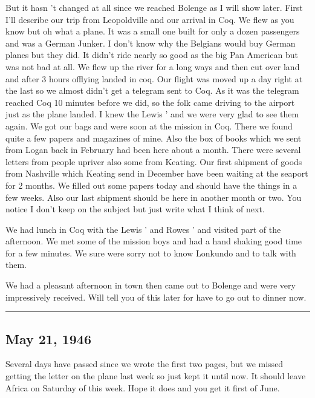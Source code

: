 \documentclass[
]{book}
\begin{document}
But it hasn 't changed at all since we reached Bolenge as I will show later. First I'll describe our trip from Leopoldville and our arrival in Coq. We flew as you know but oh what a plane. It was a small one built for only a dozen passengers and was a German Junker. I don't know why the Belgians would buy German planes but they did. It didn't ride nearly so good as the big Pan American but was not bad at all. We flew up the river for a long ways and then cut over land and after 3 hours offlying landed in coq. Our flight was moved up a day right at the last so we almost didn't get a telegram sent to Coq. As it was the telegram reached Coq 10 minutes before we did, so the folk came driving to the airport just as the plane landed. I knew the Lewis ' and we were very glad to see them again. We got our bags and were soon at the mission in Coq. There we found quite a few papers and magazines of mine. Also the box of books which we sent from Logan back in February had been here about a month. There were several letters from people upriver also some from Keating. Our first shipment of goods from Nashville which Keating send in December have been waiting at the seaport for 2 months. We filled out some papers today and should have the things in a few weeks. Also our last shipment should be here in another month or two. You notice I don't keep on the subject but just write what I think of next.

We had lunch in Coq with the Lewis ' and Rowes ' and visited part of the afternoon. We met some of the mission boys and had a hand shaking good time for a few minutes. We sure were sorry not to know Lonkundo and to talk with them.

We had a pleasant afternoon in town then came out to Bolenge and were very impressively received. Will tell you of this later for have to go out to dinner now.

\begin{center}\rule{0.5\linewidth}{0.5pt}\end{center}

\hypertarget{may-21-1946}{%
\subsection{May 21, 1946}\label{may-21-1946}}

Several days have passed since we wrote the first two pages, but we missed getting the letter on the plane last week so just kept it until now. It should leave Africa on Saturday of this week. Hope it does and you get it first of June.
\end{document}
